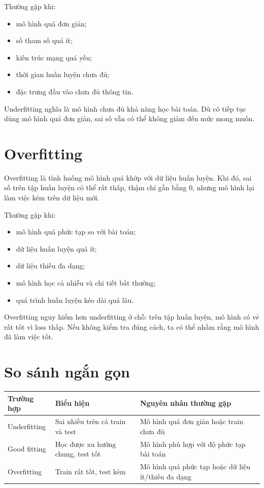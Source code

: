 \documentclass[12pt,a4paper]{report}
\begin{document}
Thường gặp khi:

\begin{itemize}
    \item mô hình quá đơn giản;
    \item số tham số quá ít;
    \item kiến trúc mạng quá yếu;
    \item thời gian huấn luyện chưa đủ;
    \item đặc trưng đầu vào chưa đủ thông tin.
\end{itemize}

\begin{ghinho}
Underfitting nghĩa là mô hình chưa đủ khả năng học bài toán. Dù có tiếp tục dùng mô hình quá đơn giản, sai số vẫn có thể không giảm đến mức mong muốn.
\end{ghinho}

\section{Overfitting}

Overfitting là tình huống mô hình quá khớp với dữ liệu huấn luyện. Khi đó, sai số trên tập huấn luyện có thể rất thấp, thậm chí gần bằng 0, nhưng mô hình lại làm việc kém trên dữ liệu mới.

Thường gặp khi:

\begin{itemize}
    \item mô hình quá phức tạp so với bài toán;
    \item dữ liệu huấn luyện quá ít;
    \item dữ liệu thiếu đa dạng;
    \item mô hình học cả nhiễu và chi tiết bất thường;
    \item quá trình huấn luyện kéo dài quá lâu.
\end{itemize}

\begin{canhbao}
Overfitting nguy hiểm hơn underfitting ở chỗ: trên tập huấn luyện, mô hình có vẻ rất tốt vì loss thấp. Nếu không kiểm tra đúng cách, ta có thể nhầm rằng mô hình đã làm việc tốt.
\end{canhbao}

\section{So sánh ngắn gọn}

\begin{center}
\begin{tabular}{p{}p{}p{}}
\toprule
Trường hợp & Biểu hiện & Nguyên nhân thường gặp \\
\midrule
Underfitting & Sai nhiều trên cả train và test & Mô hình quá đơn giản hoặc train chưa đủ \\
Good fitting & Học được xu hướng chung, test tốt & Mô hình phù hợp với độ phức tạp bài toán \\
Overfitting & Train rất tốt, test kém & Mô hình quá phức tạp hoặc dữ liệu ít/thiếu đa dạng \\
\bottomrule
\end{tabular}
\end{center}
\end{document}
